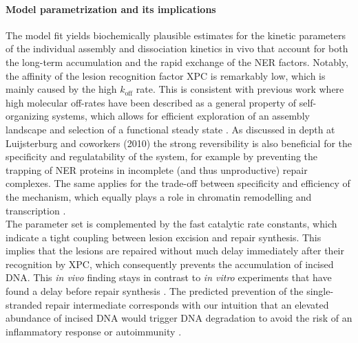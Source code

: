\paragraph{Model parametrization and its implications}
The model fit yields biochemically plausible estimates for the kinetic parameters of the individual assembly and dissociation kinetics in vivo that account for both the long-term accumulation and the rapid exchange of the NER factors. Notably, the affinity of the lesion recognition factor XPC is remarkably low, which is mainly caused by the high $k_{\text{off}}$ rate. This is consistent with previous work where high molecular off-rates have been described as a general property of self-organizing systems, which allows for efficient exploration of an assembly landscape and selection of a functional steady state \cite{Kirschner2000}. As discussed in depth at Luijsterburg and coworkers (2010)\cite{Luijsterburg2010} the strong reversibility is also beneficial for the specificity and regulatability of the system, for example by preventing the trapping of NER proteins in incomplete (and thus unproductive) repair complexes. The same applies for the trade-off between specificity and efficiency of the mechanism, which equally plays a role in chromatin remodelling and transcription \cite{Cook2010,Voss2011}.\\
The parameter set is complemented by the fast catalytic rate constants, which indicate a tight coupling between lesion excision and repair synthesis. This implies that the lesions are repaired without much delay immediately after their recognition by XPC, which consequently prevents the accumulation of incised DNA. This \textit{in vivo} finding stays in contrast to \textit{in vitro} experiments that have found a delay before repair synthesis \cite{Mocquet2008,Riedl2003}. The predicted prevention of the single-stranded repair intermediate corresponds with our intuition that an elevated abundance of incised DNA would trigger DNA degradation to avoid the risk of an inflammatory response or autoimmunity \cite{Takeuchi2010}.             



